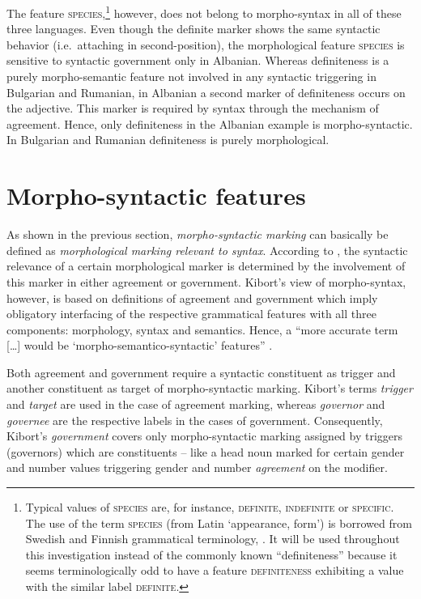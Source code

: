 The feature \textsc{species},\footnote{Typical values of \textsc{species} are, for instance, \textsc{definite, indefinite} or \textsc{specific}. The use of the term \textsc{species} (from Latin ‘appearance, form’) is borrowed from Swedish and Finnish grammatical terminology, \cite[cf., e.g.,][]{holm-etal1970,itkonen-t1980a}. It will be used throughout this investigation instead of the commonly known “definiteness” because it seems terminologically odd to have a feature \textsc{definiteness} exhibiting a value with the similar label \textsc{definite}.} however, does not belong to morpho-syntax in all of these three languages. Even though the definite marker shows the same syntactic behavior (i.e.~attaching in second-position), the morphological feature \textsc{species} is sensitive to syntactic government only in Albanian. Whereas definiteness is a purely morpho-semantic feature not involved in any syntactic triggering in Bulgarian and Rumanian, in Albanian a second marker of definiteness occurs on the adjective. This marker is required by syntax through the mechanism of agreement. Hence, only definiteness in the Albanian example is morpho-syntactic. In Bulgarian and Rumanian definiteness is purely morphological.

\section{Morpho-syntactic features} \label{crit eval}

As shown in the previous section, \emph{morpho-syntactic marking} can basically be defined as \emph{morphological marking relevant to syntax}. According to \cite{kibort2008a}, the syntactic relevance of a certain morphological marker is determined by the involvement of this marker in either agreement or government. Kibort's view of morpho-syntax, however, is based on definitions of {agreement} and {government} which imply obligatory interfacing of the respective grammatical features with all three components: morphology, syntax and semantics. Hence, a “more accurate term [\dots] would be ‘morpho-semantico-syntactic’ features” \citep{kibort2008a}. 

Both agreement and government require a syntactic constituent as trigger and another constituent as target of morpho-syntactic marking. Kibort's terms \emph{trigger} and \emph{target} are used in the case of agreement marking, whereas \emph{governor} and \emph{governee} are the respective labels in the cases of government. Consequently, Kibort's \emph{government} covers only morpho-syntactic marking assigned by triggers (governors) which are constituents – like a head noun marked for certain gender and number values triggering gender and number \emph{agreement} on the modifier.

